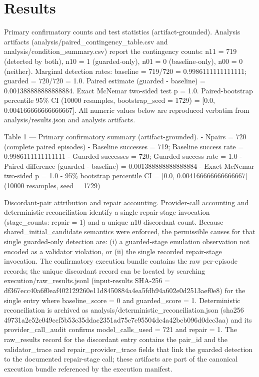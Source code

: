 \documentclass[conference]{IEEEtran}
\begin{document}
\section{Results}
Primary confirmatory counts and test statistics (artifact-grounded). Analysis artifacts (analysis/paired\_contingency\_table.csv and analysis/condition\_summary.csv) report the contingency counts: n11 = 719 (detected by both), n10 = 1 (guarded-only), n01 = 0 (baseline-only), n00 = 0 (neither). Marginal detection rates: baseline = 719/720 = 0.9986111111111111; guarded = 720/720 = 1.0. Paired estimate (guarded - baseline) = 0.001388888888888884. Exact McNemar two-sided test p = 1.0. Paired-bootstrap percentile 95\% CI (10000 resamples, bootstrap\_seed = 1729) = [0.0, 0.004166666666666667]. All numeric values below are reproduced verbatim from analysis/results.json and analysis artifacts.

Table 1 --- Primary confirmatory summary (artifact-grounded).
- Npairs = 720 (complete paired episodes)
- Baseline successes = 719; Baseline success rate = 0.9986111111111111
- Guarded successes = 720; Guarded success rate = 1.0
- Paired difference (guarded - baseline) = 0.001388888888888884
- Exact McNemar two-sided p = 1.0
- 95\% bootstrap percentile CI = [0.0, 0.004166666666666667] (10000 resamples, seed = 1729)

Discordant-pair attribution and repair accounting. Provider-call accounting and deterministic reconciliation identify a single repair-stage invocation (stage\_counts: repair = 1) and a unique n10 discordant count. Because shared\_initial\_candidate semantics were enforced, the permissible causes for that single guarded-only detection are: (i) a guarded-stage emulation observation not encoded as a validator violation, or (ii) the single recorded repair-stage invocation. The confirmatory execution bundle contains the raw per-episode records; the unique discordant record can be located by searching execution/raw\_results.jsonl (input-results SHA-256 = df367ecc\allowbreak{}40a6f0ea\allowbreak{}f4021292\allowbreak{}60e11d84\allowbreak{}50884a4e\allowbreak{}a5fdb94a\allowbreak{}602e0d25\allowbreak{}13aef0e8) for the single entry where baseline\_score = 0 and guarded\_score = 1. Deterministic reconciliation is archived as analysis/deterministic\_reconciliation.json (sha256 49731a2e\allowbreak{}52e049cc\allowbreak{}f5b53c35\allowbreak{}ddac2351\allowbreak{}ad75e7e9\allowbreak{}5504dc4a\allowbreak{}42bcb096\allowbreak{}d0dec3aa) and its provider\_call\_audit confirms model\_calls\_used = 721 and repair = 1. The raw\_results record for the discordant entry contains the pair\_id and the validator\_trace and repair\_provider\_trace fields that link the guarded detection to the documented repair-stage call; these artifacts are part of the canonical execution bundle referenced by the execution manifest.
\end{document}
